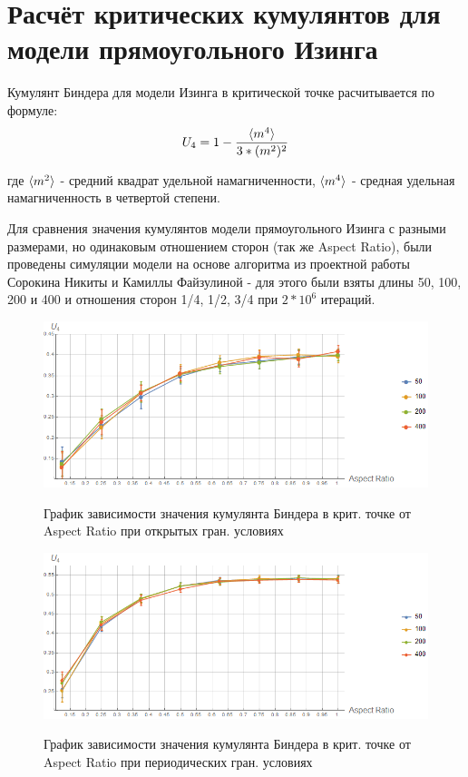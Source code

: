 \section{Расчёт критических кумулянтов для модели прямоугольного Изинга}

Кумулянт Биндера для модели Изинга в критической точке расчитывается по формуле:
\begin{equation}
\label{eq:Cumulant}
U_{4} = 1 - \frac{\langle m^{4} \rangle}{3 * (m^{2})^{2}}
\end{equation}

где $\langle m^{2} \rangle$ - средний квадрат удельной намагниченности, $\langle m^{4} \rangle$ - средная удельная намагниченность в четвертой степени. 

Для сравнения значения кумулянтов модели прямоугольного Изинга с разными размерами, но одинаковым отношением сторон (так же Aspect Ratio), были проведены симуляции модели на основе алгоритма из проектной работы Сорокина Никиты \cite{Schro} и Камиллы Файзулиной \cite{SAW} - для этого были взяты длины 50, 100, 200 и 400 и отношения сторон 1/4, 1/2, 3/4 при $2 * 10^{6}$ итераций.

\begin{figure}[!h]
    \centering
    \includegraphics[width=150mm]{Sections/Images/CumulantOBC.png}
    \label{fig:CumulOBC}
    \caption{График зависимости значения кумулянта Биндера в крит. точке от Aspect Ratio при открытых гран. условиях}
\end{figure}

\begin{figure}[!h]
    \centering
    \includegraphics[width=150mm]{Sections/Images/CumulantPBC.png}
    \label{fig:CumulOBC}
    \caption{График зависимости значения кумулянта Биндера в крит. точке от Aspect Ratio при периодических гран. условиях}
\end{figure}